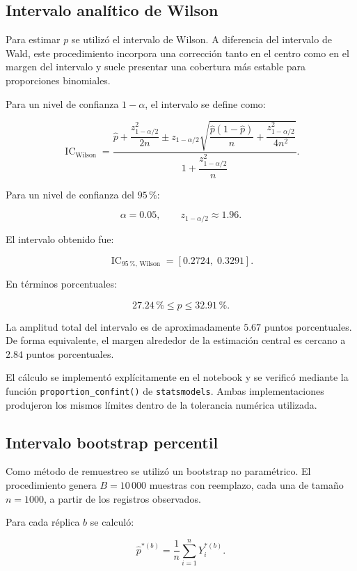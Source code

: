 \subsection{Intervalo analítico de Wilson}

Para estimar \(p\) se utilizó el intervalo de Wilson. A diferencia del
intervalo de Wald, este procedimiento incorpora una corrección tanto en
el centro como en el margen del intervalo y suele presentar una cobertura
más estable para proporciones binomiales.

Para un nivel de confianza \(1-\alpha\), el intervalo se define como:

\[
\operatorname{IC}_{\mathrm{Wilson}}
=
\frac{
    \widehat{p}
    +
    \dfrac{z_{1-\alpha/2}^{2}}{2n}
    \pm
    z_{1-\alpha/2}
    \sqrt{
        \dfrac{\widehat{p}(1-\widehat{p})}{n}
        +
        \dfrac{z_{1-\alpha/2}^{2}}{4n^{2}}
    }
}{
    1+\dfrac{z_{1-\alpha/2}^{2}}{n}
}.
\]

Para un nivel de confianza del \(95\,\%\):

\[
\alpha=0.05,
\qquad
z_{1-\alpha/2}\approx 1.96.
\]

El intervalo obtenido fue:

\[
\operatorname{IC}_{95\,\%,\,\mathrm{Wilson}}
=
[0.2724,\;0.3291].
\]

En términos porcentuales:

\[
27.24\,\%
\leq
p
\leq
32.91\,\%.
\]

La amplitud total del intervalo es de aproximadamente \(5.67\) puntos
porcentuales. De forma equivalente, el margen alrededor de la estimación
central es cercano a \(2.84\) puntos porcentuales.

El cálculo se implementó explícitamente en el notebook y se verificó
mediante la función \texttt{proportion\_confint()} de
\texttt{statsmodels}. Ambas implementaciones produjeron los mismos
límites dentro de la tolerancia numérica utilizada.

\subsection{Intervalo bootstrap percentil}

Como método de remuestreo se utilizó un bootstrap no paramétrico. El
procedimiento genera \(B=10\,000\) muestras con reemplazo, cada una de
tamaño \(n=1000\), a partir de los registros observados.

Para cada réplica \(b\) se calculó:

\[
\widehat{p}^{*(b)}
=
\frac{1}{n}
\sum_{i=1}^{n}
Y_i^{*(b)}.
\]

